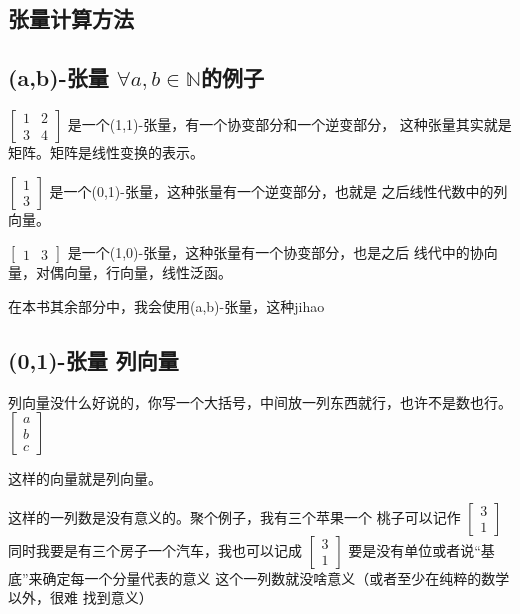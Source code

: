 \documentclass{book}
\begin{document}
\begin{CJK}{UTF8}{gbsn}
    \section{张量计算方法}

    \subsection{(a,b)-张量 \texorpdfstring{$\forall a,b \in \mathbb{N}$}{∀a,b∈N}的例子}

    $\left[\begin{matrix}
                1 & 2 \\
                3 & 4
            \end{matrix}\right]$
    是一个(1,1)-张量，有一个协变部分和一个逆变部分，
    这种张量其实就是矩阵。矩阵是线性变换的表示。

    $\left[\begin{matrix}
                1 \\
                3
            \end{matrix}\right]$
    是一个(0,1)-张量，这种张量有一个逆变部分，也就是
    之后线性代数中的列向量。

    $\left[\begin{matrix}
                1 & 3
            \end{matrix}\right]$
    是一个(1,0)-张量，这种张量有一个协变部分，也是之后
    线代中的协向量，对偶向量，行向量，线性泛函。

    在本书其余部分中，我会使用(a,b)-张量，这种jihao

    \subsection{(0,1)-张量 列向量}
    列向量没什么好说的，你写一个大括号，中间放一列东西就行，也许不是数也行。
    $\left[\begin{matrix}
                a \\
                b \\
                c
            \end{matrix}\right]$

    这样的向量就是列向量。

    这样的一列数是没有意义的。聚个例子，我有三个苹果一个
    桃子可以记作
    $\left[\begin{matrix}
                3 \\
                1
            \end{matrix}\right]$
    同时我要是有三个房子一个汽车，我也可以记成
    $\left[\begin{matrix}
                3 \\
                1
            \end{matrix}\right]$
    要是没有单位或者说“基底”来确定每一个分量代表的意义
    这个一列数就没啥意义（或者至少在纯粹的数学以外，很难
    找到意义）


\end{CJK}
\end{document}
